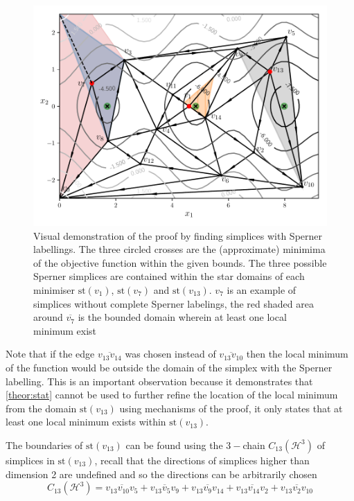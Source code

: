 \begin{figure}
\centerline{\includegraphics[scale=0.65]{./Fig9.pdf}}
{\caption{Visual demonstration of the proof by finding simplices with Sperner labellings. The three circled crosses are the (approximate) minimima of the objective function within the given bounds. The three possible Sperner simplices are contained within the star domains of each minimiser $\textrm{st}\left(v_{1}\right)$, $\textrm{st}\left(v_{7}\right)$ and $\textrm{st}\left(v_{13}\right)$. $v_{7}$ is an example of simplices without complete Sperner labelings, the red shaded area around $\overline{v_7}$ is the bounded domain wherein at least one local minimum exist
} \label{fig:Sperner}} 
\end{figure}

Note that if the edge $\overline{v_{13} v_{14}}$ was chosen instead of $\overline{v_{13}  v_{10}}$ then the local minimum of the function would be outside the domain of the simplex with the Sperner labelling. This is an important observation because it demonstrates that \autoref{theor:stat} cannot be used to further refine the location of the local minimum from the domain $\textrm{st}\left(v_{13}\right)$ using mechanisms of the proof, it only states that at least one local minimum exists within $\textrm{st}\left(v_{13}\right)$.

The boundaries of $\textrm{st}\left(v_{13}\right)$ can be found using the $3-$chain $C_{13}(\mathcal{H}^3)$ of simplices in $\textrm{st}\left( v_{13} \right)$, recall that the directions of simplices higher than dimension 2 are undefined and so the directions can be arbitrarily chosen $$C_{13}(\mathcal{H}^3) = \overline{v_{13} v_{10} v_{5}} + \overline{v_{13} v_{5} v_{9}} + \overline{v_{13} v_{9} v_{14}} + \overline{v_{13} v_{14} v_{2}} + \overline{v_{13} v_{2} v_{10}}$$

